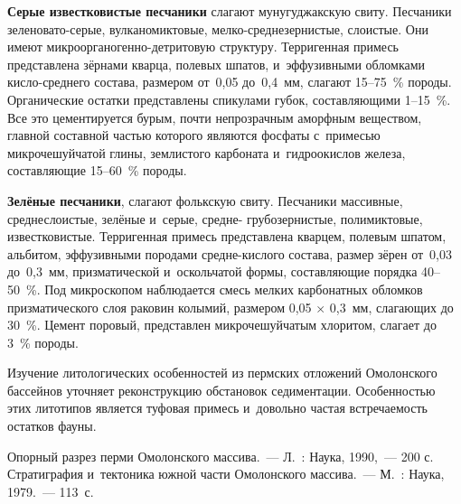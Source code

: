 \textbf{Серые известковистые песчаники} слагают мунугуджакскую свиту. Песчаники зе\-ле\-но\-ва\-то-серые, вулканомиктовые, мелко-среднезернистые, слоистые. Они имеют микро\-ор\-га\-но\-ген\-но-детритовую структуру. Терригенная примесь представлена зёрнами кварца, полевых шпатов, и~эффузивными обломками кисло-среднего состава, размером от~0,05 до~0,4~мм, слагают 15--75~\% породы. Органические остатки представлены спикулами губок, составляющими 1--15~\%. Все это цементируется бурым, почти непрозрачным аморфным веществом, главной составной частью которого являются фосфаты с~примесью микрочешуйчатой глины, землистого карбоната и~гидроокислов железа, составляющие 15--60~\% породы.

\textbf{Зелёные песчаники}, слагают фолькскую свиту. Песчаники массивные, среднеслоистые, зелёные и~серые, средне- грубозернистые, полимиктовые, известковистые. Терригенная примесь представлена кварцем, полевым шпатом, альбитом, эффузивными породами средне-кислого состава, размер зёрен от~0,03 до~0,3~мм, призматической и~оскольчатой формы, составляющие порядка 40--50~\%. Под микроскопом наблюдается смесь мелких карбонатных обломков призматического слоя раковин колымий, размером 0,05 $\times$ 0,3~мм, слагающих до 30~\%. Цемент поровый, представлен микрочешуйчатым хлоритом, слагает до 3~\% породы.

Изучение литологических особенностей из пермских отложений Омолонского бассейнов уточняет реконструкцию обстановок седиментации. Особенностью этих литотипов является туфовая примесь и~довольно частая встречаемость остатков фауны.
\vspace{-8pt}
\begin{thebibliography}{99}
\vspace{-6pt}
\bibitem{} Опорный разрез перми Омолонского массива.~--- Л.~: Наука, 1990,~--- 200 с.\enlargethispage{2\baselineskip}
\bibitem{} Стратиграфия и~тектоника южной части Омолонского массива.~--- М.~: Наука, 1979.~--- 113~с.
\end{thebibliography}
